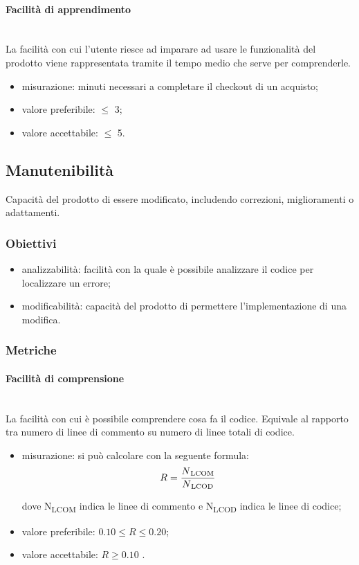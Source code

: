 			\paragraph{Facilità di apprendimento}\mbox{}\\
			La facilità con cui l'utente riesce ad imparare ad usare le funzionalità del prodotto viene rappresentata tramite il tempo medio che serve per comprenderle.
			\begin{itemize}
			\item misurazione: minuti necessari a completare il checkout di un acquisto;
			\item valore preferibile: $\leq$ 3;
			\item valore accettabile: $\leq$ 5.
			\end{itemize}
		
	\subsection{Manutenibilità}
	Capacità del prodotto di essere modificato, includendo correzioni, miglioramenti o adattamenti.
		\subsubsection{Obiettivi}
		\begin{itemize}
			\item analizzabilità: facilità con la quale è possibile analizzare il codice per localizzare un errore;
			\item modificabilità: capacità del prodotto di permettere l'implementazione di una modifica.
		\end{itemize}
		\subsubsection{Metriche}
			\paragraph{Facilità di comprensione}\mbox{}\\
			La facilità con cui è possibile comprendere cosa fa il codice. Equivale al rapporto tra numero di linee di commento su numero di linee totali di codice. %
			\begin{itemize}
			\item misurazione: si può calcolare con la seguente formula: \\
			$$ R = \frac{N\textsubscript{LCOM}}{N\textsubscript{LCOD}}  $$
		
			dove N\textsubscript{LCOM} indica le linee di commento e N\textsubscript{LCOD} indica le linee di codice;
			\item valore preferibile: $0.10 \leq R \leq 0.20$;
			\item valore accettabile: $R \geq 0.10$ .
			\end{itemize}
